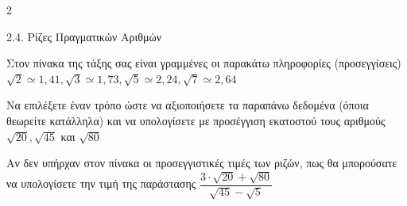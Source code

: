 \begin{ylh}{2}
    \item 2.4. Ρίζες Πραγματικών Αριθμών
\end{ylh}
Στον πίνακα της τάξης σας είναι γραμμένες οι παρακάτω πληροφορίες (προσεγγίσεις)
$\sqrt{2} \simeq 1,41,\sqrt{3} \simeq 1,73,\sqrt{5} \simeq 2,24,\sqrt{7} \simeq 2,64$
\begin{alist}
\item Να επιλέξετε έναν τρόπο ώστε να αξιοποιήσετε τα παραπάνω δεδομένα (όποια θεωρείτε κατάλληλα) και να υπολογίσετε με προσέγγιση εκατοστού τους αριθμούς $\sqrt{20}, \sqrt{45}$ και $\sqrt{80}$
\item Αν δεν υπήρχαν στον πίνακα οι προσεγγιστικές τιμές των ριζών, πως θα μπορούσατε να υπολογίσετε την τιμή της παράστασης $\dfrac{3 \cdot \sqrt{20} + \sqrt{80}}{\sqrt{45} - \sqrt{5}}$
\end{alist}

